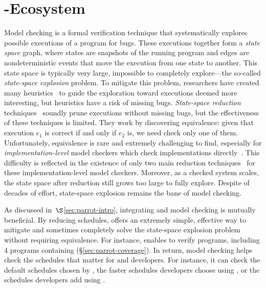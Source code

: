 \section{\parrot-\dbug Ecosystem} \label{sec:parrot-mc}



Model checking is a formal verification technique that systematically
explores possible executions of a program for bugs.  These executions
together form a \emph{state space} graph, where states are snapshots of the
running program and edges are nondeterministic events that move the
execution from one state to another.  This state space is typically very
large, impossible to completely explore---the so-called \emph{state-space
  explosion} problem.  To mitigate this problem, researchers have created
many heuristics~\cite{yang:fisc:osdi,musuvathi:aodv,killian:macemc:nsdi07} to guide the exploration toward executions
deemed more interesting, but heuristics have a risk of missing bugs.
\emph{State-space reduction} techniques~\cite{flanagan:dynamicpo,godefroid:verisoft,demeter:sosp11} soundly prune
executions without missing bugs, but the effectiveness of these techniques
is limited.  They work by discovering equivalence: given
that execution $e_1$ is correct if and only if $e_2$ is, we need check only
one of them. Unfortunately, equivalence is rare and extremely challenging
to find, especially for \emph{implementation-level} model checkers which
check implementations directly~\cite{godefroid:verisoft,musuvathi:aodv,yang:fisc:osdi,yang:explode:osdi,killian:macemc:nsdi07,dbug:spin11}.
This difficulty is reflected in the existence of only two main reduction
techniques~\cite{flanagan:dynamicpo, demeter:sosp11} for these implementation-level model
checkers.  Moreover, as a checked system scales, the state space after
reduction still grows too large to fully explore.  Despite of
decades of effort, state-space explosion remains the bane of model
checking.

As discussed in~$\S$\ref{sec:parrot-intro}, integrating \smt and model checking is
mutually beneficial.  By reducing schedules, \smt offers an extremely
simple, effective way to mitigate and sometimes completely solve the
state-space explosion problem without requiring equivalence.  For
instance, \parrot enables \dbug to verify \nprogverifiedxxx programs,
including 4 programs containing \nondets (\S\ref{sec:parrot-coverage}).
In return, model
checking helps check the schedules that matter for \parrot and developers.
For instance, it can check the default schedules chosen by \parrot, the
faster schedules developers choose using \computes, or the schedules
developers add using \nondets.

